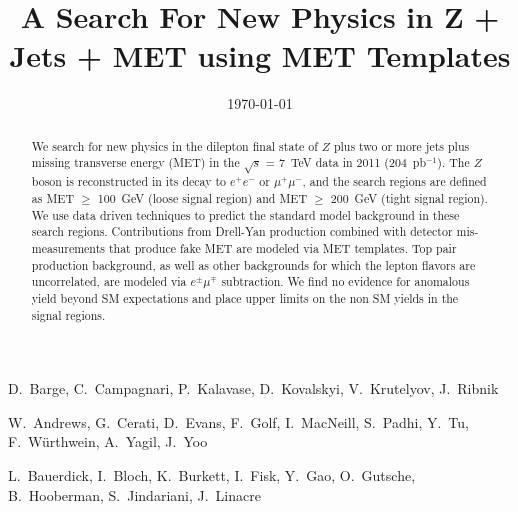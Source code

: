 \documentclass{cmspaper}
\newcommand{\Z}{$Z$ } %
\newcommand{\lumi}{204~pb$^{-1}$}
\newcommand{\signalmetl}{100}
\newcommand{\signalmett}{200}
\begin{document}
\begin{titlepage}


  \date{\today}
 
  \title{A Search For New Physics in Z + Jets + MET using MET Templates}

  \begin{Authlist}
    D.~Barge, C.~Campagnari, P.~Kalavase, D.~Kovalskyi, V.~Krutelyov, J.~Ribnik

    W.~Andrews, G.~Cerati, D.~Evans, F.~Golf, I.~MacNeill, S.~Padhi, Y.~Tu, F.~W\"urthwein, A.~Yagil, J.~Yoo

	L.~Bauerdick, I.~Bloch, K.~Burkett, I.~Fisk, Y.~Gao, O.~Gutsche, B.~Hooberman, S.~Jindariani, J.~Linacre
  \end{Authlist}

  \begin{abstract}

\begin{comment}

We search for new physics in the dilepton final state of Z plus two or more jets plus missing transverse 
energy (MET) in the $\sqrt{s}$ = 7~TeV data in 2011 (204~pb$^{-1}$). 
The Z boson is reconstructed in its decay to $e^+e^-$ or $\mu^+\mu^-$, and
the search regions are defined as MET $\ge$ 100 GeV (loose signal region) and 
MET $\ge$ 200 GeV (tight signal region). 
We use data driven techniques to predict the standard model background in these
search regions. 
Contributions from Drell-Yan production combined with detector mis-measurements that produce 
fake MET are modeled via MET templates.
Top pair production background, as well as other backgrounds for which the lepton
flavors are uncorrelated, are modeled via $e^\pm\mu^\mp$ subtraction.
We find no evidence
for anomalous yield beyond SM expectations and place upper limits
on the non SM yields in the signal regions.

\end{comment}


We search for new physics in the dilepton final state of \Z plus two or more jets plus missing transverse 
energy (MET) in the $\sqrt{s}$ = 7~TeV data in 2011 (\lumi). 
The \Z boson is reconstructed in its decay to $e^+e^-$ or $\mu^+\mu^-$, and
the search regions are defined as MET $\ge$ \signalmetl~GeV (loose signal region) and 
MET $\ge$ \signalmett~GeV (tight signal region). 
We use data driven techniques to predict the standard model background in these
search regions. 
Contributions from Drell-Yan production combined with detector mis-measurements that produce 
fake MET are modeled via MET templates.
Top pair production background, as well as other backgrounds for which the lepton
flavors are uncorrelated, are modeled via $e^\pm\mu^\mp$ subtraction.
We find no evidence
for anomalous yield beyond SM expectations and place upper limits
on the non SM yields in the signal regions.



\end{abstract}
\end{titlepage}
\end{document}
